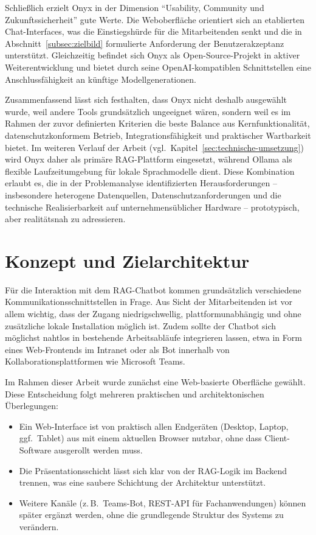Schließlich erzielt Onyx in der Dimension \enquote{Usability, Community und Zukunftssicherheit} gute Werte.
Die Weboberfläche orientiert sich an etablierten Chat-Interfaces, was die Einstiegshürde für die Mitarbeitenden senkt und die in Abschnitt~\ref{subsec:zielbild} formulierte Anforderung der Benutzerakzeptanz unterstützt.
Gleichzeitig befindet sich Onyx als Open-Source-Projekt in aktiver Weiterentwicklung und bietet durch seine OpenAI-kompatiblen Schnittstellen eine Anschlussfähigkeit an künftige Modellgenerationen.

Zusammenfassend lässt sich festhalten, dass Onyx nicht deshalb ausgewählt wurde, weil andere Tools grundsätzlich ungeeignet wären, sondern weil es im Rahmen der zuvor definierten Kriterien die beste Balance aus Kernfunktionalität, datenschutzkonformem Betrieb, Integrationsfähigkeit und praktischer Wartbarkeit bietet.
Im weiteren Verlauf der Arbeit (vgl.\ Kapitel~\ref{sec:technische-umsetzung}) wird Onyx daher als primäre RAG-Plattform eingesetzt, während Ollama als flexible Laufzeitumgebung für lokale Sprachmodelle dient.
Diese Kombination erlaubt es, die in der Problemanalyse identifizierten Herausforderungen – insbesondere heterogene Datenquellen, Datenschutzanforderungen und die technische Realisierbarkeit auf unternehmensüblicher Hardware – prototypisch, aber realitätsnah zu adressieren.

\section{Konzept und Zielarchitektur}\label{sec:architektur}

Für die Interaktion mit dem RAG-Chatbot kommen grundsätzlich verschiedene Kommunikationsschnittstellen in Frage.
Aus Sicht der Mitarbeitenden ist vor allem wichtig, dass der Zugang niedrigschwellig, plattformunabhängig und ohne zusätzliche lokale Installation möglich ist.
Zudem sollte der Chatbot sich möglichst nahtlos in bestehende Arbeitsabläufe integrieren lassen, etwa in Form eines Web-Frontends im Intranet oder als Bot innerhalb von Kollaborationsplattformen wie Microsoft Teams.
\par
Im Rahmen dieser Arbeit wurde zunächst eine Web-basierte Oberfläche gewählt.
Diese Entscheidung folgt mehreren praktischen und architektonischen Überlegungen:

\begin{itemize}
    \item Ein Web-Interface ist von praktisch allen Endgeräten (Desktop, Laptop, ggf.\ Tablet) aus mit einem aktuellen Browser nutzbar, ohne dass Client-Software ausgerollt werden muss.
    \item Die Präsentationsschicht lässt sich klar von der RAG-Logik im Backend trennen, was eine saubere Schichtung der Architektur unterstützt.
    \item Weitere Kanäle (z.\,B.\ Teams-Bot, REST-API für Fachanwendungen) können später ergänzt werden, ohne die grundlegende Struktur des Systems zu verändern.
\end{itemize}

